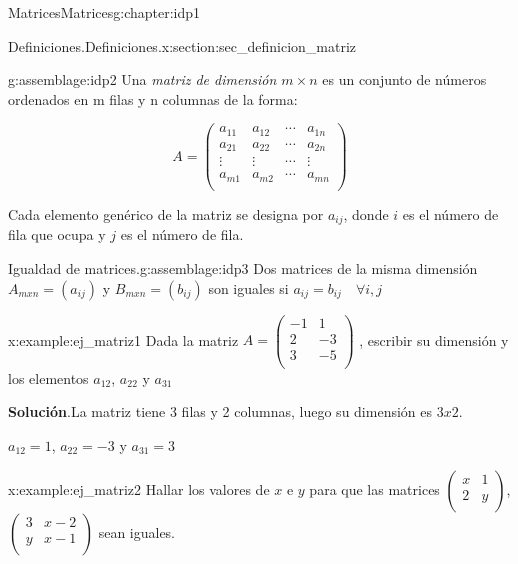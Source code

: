 \documentclass[oneside,12pt,]{book}
\newcommand{\blocktitlefont}{\relax}
\newcommand{\amp}{&}
\begin{document}
\begin{chapterptx}{Matrices}{}{Matrices}{}{}{g:chapter:idp1}
%
%
\typeout{************************************************}
\typeout{************************************************}
%
\begin{sectionptx}{Definiciones.}{}{Definiciones.}{}{}{x:section:sec_definicion_matriz}
\begin{assemblage}{}{g:assemblage:idp2}%
Una \emph{matriz de dimensión \(m \times n\)} es un conjunto de números ordenados en m filas y n columnas de la forma:%
\par
%
\begin{equation*}
A=\begin{pmatrix} 
a_{11} \amp a_{12} \amp \cdots \amp a_{1n} \\
a_{21} \amp a_{22} \amp \cdots \amp a_{2n} \\
\vdots  \amp \vdots  \amp \cdots \amp \vdots \\
a_{m1} \amp a_{m2} \amp \cdots \amp a_{mn} \\
\end{pmatrix}
\end{equation*}
%
\end{assemblage}
Cada elemento genérico de la matriz se designa por \(a_{ij}\), donde \(i\) es el número de fila que ocupa y \(j\) es el número de fila.%
\begin{assemblage}{Igualdad de matrices.}{g:assemblage:idp3}%
Dos matrices de la misma dimensión \(A_{mxn}=(a_{ij})\) y \(B_{mxn}=(b_{ij})\) son iguales si \(a_{ij}=b_{ij}\quad \forall i,j\)%
\end{assemblage}
\begin{example}{}{x:example:ej_matriz1}%
Dada la matriz \(A= \begin{pmatrix}  -1 \amp 1  \\  2 \amp -3 \\  3 \amp -5 \\ \end{pmatrix}\) , escribir su dimensión y los elementos \(a_{12}\), \(a_{22}\) y \(a_{31}\)%
\par\smallskip%
\noindent\textbf{\blocktitlefont Solución}.\hypertarget{g:solution:idp4}{}\quad{}La matriz tiene 3 filas y  2 columnas, luego su dimensión es \(3x2\).%
\par
\(a_{12} = 1\), \(a_{22}= -3\) y \(a_{31}=3\)%
\end{example}
\begin{example}{}{x:example:ej_matriz2}%
Hallar los valores de \(x\) e \(y\) para que las matrices \(\begin{pmatrix}  x \amp 1 \\  2 \amp y \\ \end{pmatrix}\), \(\begin{pmatrix}  3 \amp x-2 \\  y \amp x-1 \\ \end{pmatrix}\) sean iguales.%

\end{example}
\end{sectionptx}
\end{chapterptx}
\end{document}
